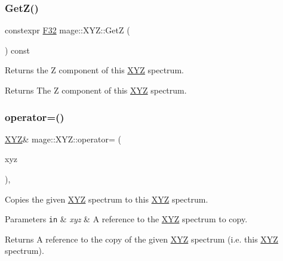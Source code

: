 \subsubsection{\texorpdfstring{Get\+Z()}{GetZ()}}
{\footnotesize\ttfamily constexpr \mbox{\hyperlink{namespacemage_aa97e833b45f06d60a0a9c4fc22ae02c0}{F32}} mage\+::\+X\+Y\+Z\+::\+GetZ (\begin{DoxyParamCaption}{ }\end{DoxyParamCaption}) const\hspace{0.3cm}{\ttfamily [noexcept]}}

Returns the Z component of this \mbox{\hyperlink{structmage_1_1_x_y_z}{X\+YZ}} spectrum.

\begin{DoxyReturn}{Returns}
The Z component of this \mbox{\hyperlink{structmage_1_1_x_y_z}{X\+YZ}} spectrum. 
\end{DoxyReturn}
\mbox{\label{structmage_1_1_x_y_z_a817c69124934fa9ad5d7d63b5696c939}} 
\subsubsection{\texorpdfstring{operator=()}{operator=()}\hspace{0.1cm}{\footnotesize\ttfamily [1/2]}}
{\footnotesize\ttfamily \mbox{\hyperlink{structmage_1_1_x_y_z}{X\+YZ}}\& mage\+::\+X\+Y\+Z\+::operator= (\begin{DoxyParamCaption}\item[{const \mbox{\hyperlink{structmage_1_1_x_y_z}{X\+YZ}} \&}]{xyz }\end{DoxyParamCaption})\hspace{0.3cm}{\ttfamily [default]}, {\ttfamily [noexcept]}}

Copies the given \mbox{\hyperlink{structmage_1_1_x_y_z}{X\+YZ}} spectrum to this \mbox{\hyperlink{structmage_1_1_x_y_z}{X\+YZ}} spectrum.


\begin{DoxyParams}[1]{Parameters}
\mbox{\tt in}  & {\em xyz} & A reference to the \mbox{\hyperlink{structmage_1_1_x_y_z}{X\+YZ}} spectrum to copy. \\
\hline
\end{DoxyParams}
\begin{DoxyReturn}{Returns}
A reference to the copy of the given \mbox{\hyperlink{structmage_1_1_x_y_z}{X\+YZ}} spectrum (i.\+e. this \mbox{\hyperlink{structmage_1_1_x_y_z}{X\+YZ}} spectrum). 
\end{DoxyReturn}
\mbox{\label{structmage_1_1_x_y_z_aa8b016328f6210e3b0b13cff7087dbee}} 
